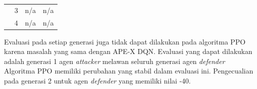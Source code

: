 \begin{table}[H]
\begin{tabular}{|c|c|c|c|}
    & 3                                                                            & n/a                                                                              & n/a                                                                              \\ \cline{2-4} 
    & 4                                                                            & n/a                                                                              & n/a                                                                              \\ \hline
  \end{tabular}
\end{table}

Evaluasi pada setiap generasi juga tidak dapat dilakukan pada algoritma PPO karena masalah yang sama dengan APE-X DQN.
Evaluasi yang dapat dilakukan adalah generasi 1 agen \emph{attacker} melawan seluruh generasi agen \emph{defender}
Algoritma PPO memiliki perubahan yang stabil dalam evaluasi ini.
Pengecualian pada generasi 2 untuk agen \emph{defender} yang memiliki nilai -40.

